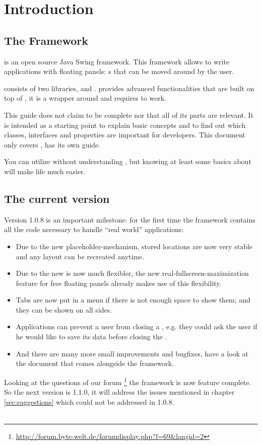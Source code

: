 \section{Introduction}
\subsection{The Framework}
 is an open source Java Swing framework. This framework allows to write applications with floating panels: s that can be moved around by the user.

 consists of two libraries,  and .  provides advanced functionalities that are built on top of , it is a wrapper around  and requires  to work.

This guide does not claim to be complete nor that all of its parts are relevant. It is intended as a starting point to explain basic concepts and to find out which classes, interfaces and properties are important for developers. This document only covers ,  has its own guide. 

You can utilize  without understanding , but knowing at least some basics about  will make life much easier.

\subsection{The current version}
Version 1.0.8 is an important milestone: for the first time the framework contains all the code necessary to handle ``real world'' applications:\begin{itemize}
 \item Due to the new placeholder-mechanism, stored locations are now very stable and any layout can be recreated anytime.
 \item Due to the new   is now much flexibler, the new real-fullscreen-maximization feature for free floating panels already makes use of this flexibility.
 \item Tabs are now put in a menu if there is not enough space to show them; and they can be shown on all sides.
 \item Applications can prevent a user from closing a , e.g. they could ask the user if he would like to save its data before closing the .
 \item And there are many more small improvements and bugfixes, have a look at the  document that comes alongside the framework.
\end{itemize}

Looking at the questions of our forum \footnote{\url{http://forum.byte-welt.de/forumdisplay.php?f=69&langid=2}} the framework is now feature complete. So the next version is 1.1.0, it will address the issues mentioned in chapter \ref{sec:suggestions} which could not be addressed in 1.0.8.\\
\\